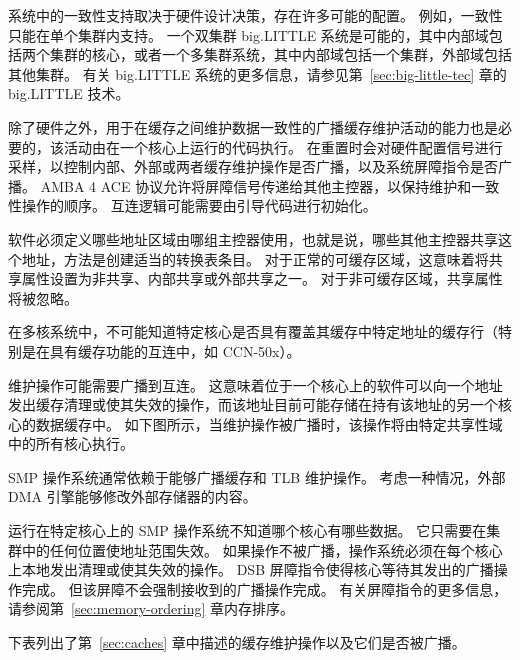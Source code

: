 系统中的一致性支持取决于硬件设计决策，存在许多可能的配置。
例如，一致性只能在单个集群内支持。
一个双集群 big.LITTLE 系统是可能的，其中内部域包括两个集群的核心，或者一个多集群系统，其中内部域包括一个集群，外部域包括其他集群。
有关 big.LITTLE 系统的更多信息，请参见第~\ref{sec:big-little-tec} 章的 big.LITTLE 技术。

除了硬件之外，用于在缓存之间维护数据一致性的广播缓存维护活动的能力也是必要的，该活动由在一个核心上运行的代码执行。
在重置时会对硬件配置信号进行采样，以控制内部、外部或两者缓存维护操作是否广播，以及系统屏障指令是否广播。
AMBA 4 ACE 协议允许将屏障信号传递给其他主控器，以保持维护和一致性操作的顺序。
互连逻辑可能需要由引导代码进行初始化。

软件必须定义哪些地址区域由哪组主控器使用，也就是说，哪些其他主控器共享这个地址，方法是创建适当的转换表条目。
对于正常的可缓存区域，这意味着将共享属性设置为非共享、内部共享或外部共享之一。
对于非可缓存区域，共享属性将被忽略。

在多核系统中，不可能知道特定核心是否具有覆盖其缓存中特定地址的缓存行（特别是在具有缓存功能的互连中，如 CCN-50x）。

维护操作可能需要广播到互连。
这意味着位于一个核心上的软件可以向一个地址发出缓存清理或使其失效的操作，而该地址目前可能存储在持有该地址的另一个核心的数据缓存中。
如下图所示，当维护操作被广播时，该操作将由特定共享性域中的所有核心执行。


SMP 操作系统通常依赖于能够广播缓存和 TLB 维护操作。
考虑一种情况，外部 DMA 引擎能够修改外部存储器的内容。

运行在特定核心上的 SMP 操作系统不知道哪个核心有哪些数据。
它只需要在集群中的任何位置使地址范围失效。
如果操作不被广播，操作系统必须在每个核心上本地发出清理或使其失效的操作。
DSB 屏障指令使得核心等待其发出的广播操作完成。
但该屏障不会强制接收到的广播操作完成。
有关屏障指令的更多信息，请参阅第~\ref{sec:memory-ordering} 章内存排序。

下表列出了第~\ref{sec:caches} 章中描述的缓存维护操作以及它们是否被广播。

